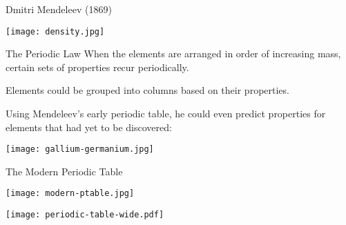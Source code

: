 \documentclass[handout]{beamer}
\begin{document}
\begin{frame}[allowframebreaks=1]{Dmitri Mendeleev (1869)}
	\begin{center}
		\texttt{[image: density.jpg]}
	\end{center}
	
	\begin{block}{The Periodic Law}
		When the elements are arranged in order of increasing mass,
		certain sets of properties recur periodically.
	\end{block}

	\framebreak%

	Elements could be \alert{grouped} into columns based on their properties.

	\begin{center}
	\end{center}

	\framebreak%

	Using Mendeleev's early periodic table, he could even predict properties
	for elements that had yet to be discovered:

	\bigskip

	\texttt{[image: gallium-germanium.jpg]}
\end{frame}

\begin{frame}[allowframebreaks=1]{The Modern Periodic Table}
	\centering

	\texttt{[image: modern-ptable.jpg]}

	\framebreak

	\texttt{[image: periodic-table-wide.pdf]}
\end{frame}

\end{document}
